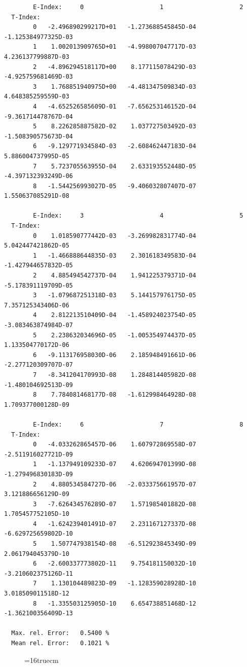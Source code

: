 \documentclass[12pt,dvips]{article}
\begin{document}
\begin{small}\begin{verbatim}
        E-Index:     0                     1                     2
  T-Index:
        0   -2.496890299217D+01   -1.273688545845D-04   -1.125384977325D-03
        1    1.002013909765D+01   -4.998007047717D-03    4.236137799887D-03
        2   -4.896294518117D+00    8.177115078429D-03   -4.925759681469D-03
        3    1.768851940975D+00   -4.481347509834D-03    4.648385259559D-03
        4   -4.652526585609D-01   -7.656253146152D-04   -9.361714478767D-04
        5    8.226285887582D-02    1.037727503492D-03   -1.508390575673D-04
        6   -9.129771934584D-03   -2.608462447183D-04    5.886004737995D-05
        7    5.723705563955D-04    2.633193552448D-05   -4.397132393249D-06
        8   -1.544256993027D-05   -9.406032807407D-07    1.550637085291D-08

        E-Index:     3                     4                     5
  T-Index:
        0    1.018590777442D-03   -3.269982831774D-04    5.042447421862D-05
        1   -1.466888644835D-03    2.301618349583D-04   -1.427944657832D-05
        2    4.885494542737D-04    1.941225379371D-04   -5.178391119709D-05
        3   -1.079687251318D-03    5.144157976175D-05    7.357125343406D-06
        4    2.812213510409D-04   -1.458924023754D-05   -3.083463874984D-07
        5    2.238632034696D-05   -1.005354974437D-05    1.133504770172D-06
        6   -9.113176958030D-06    2.185948491661D-06   -2.277120309707D-07
        7   -8.341204170993D-08    1.284814405982D-08   -1.480104692513D-09
        8    7.784081468177D-08   -1.612998464928D-08    1.709377000128D-09

        E-Index:     6                     7                     8
  T-Index:
        0   -4.033262865457D-06    1.607972869558D-07   -2.511916027721D-09
        1   -1.137949109233D-07    4.620694701399D-08   -1.279496830183D-09
        2    4.880534584727D-06   -2.033375661957D-07    3.121886656129D-09
        3   -7.626434576289D-07    1.571985401882D-08    1.705457752105D-10
        4   -1.624239401491D-07    2.231167127337D-08   -6.629725659802D-10
        5    1.507747938154D-08   -6.512923845349D-09    2.061794045379D-10
        6   -2.600337773802D-11    9.754181150032D-10   -3.210602375126D-11
        7    1.130104489823D-09   -1.128359028928D-10    3.018509011518D-12
        8   -1.335503125905D-10    6.654738851468D-12   -1.362100356409D-13

  Max. rel. Error:   0.5400 %
  Mean rel. Error:   0.1021 %

\end{verbatim}\end{small}
\begin{figure} \label{2.1.5iFU}
\epsfxsize=16truecm
\end{figure}
\newpage
\end{document}

